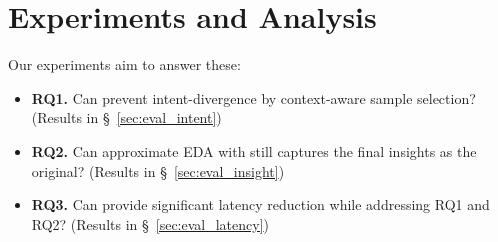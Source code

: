 \section{Experiments and Analysis}
Our experiments aim to answer these:

\begin{itemize}
    \item \textbf{RQ1.} Can \name prevent intent-divergence by context-aware sample selection? 
    (Results in \S~\ref{sec:eval_intent})
    \item \textbf{RQ2.} Can approximate EDA with \name still captures the final insights as the original?
    (Results in \S~\ref{sec:eval_insight})
    \item \textbf{RQ3.} Can \name provide significant latency reduction while addressing RQ1 and RQ2?
    (Results in \S~\ref{sec:eval_latency})
\end{itemize}

